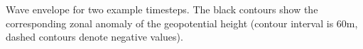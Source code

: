 \label{fig:example_envelope}
Wave envelope for two example timesteps. The black contours show the corresponding zonal anomaly of the geopotential height (contour interval is 60m, dashed contours denote negative values). 
